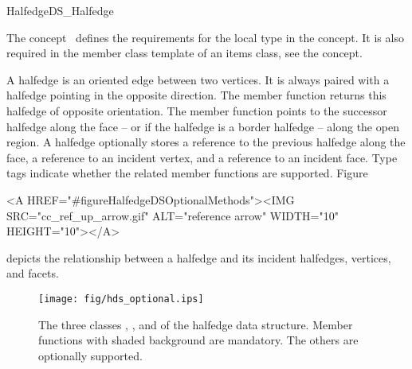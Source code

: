 
\ccRefPageBegin



\begin{ccRefConcept}{HalfedgeDS_Halfedge}
\label{pageHalfedgeDSItemsHalfedgeRef}

\ccDefinition
  
The concept \ccRefName\ defines the requirements for the local  
type in the  concept. It is also required in 
the  member class template of an
items class, see the  concept.

A halfedge is an oriented edge between two vertices. It is always
paired with a halfedge pointing in the opposite direction. The
 member function returns this halfedge of opposite
orientation. The  member function points to the successor
halfedge along the face -- or if the halfedge is a border halfedge --
along the open region. A halfedge optionally stores a reference to the
previous halfedge along the face, a reference to an incident vertex,
and a reference to an incident face. Type tags indicate whether the
related member functions are supported.
Figure~\begin{ccHtmlOnly}
  <A HREF="#figureHalfedgeDSOptionalMethods"><IMG 
  SRC="cc_ref_up_arrow.gif" ALT="reference arrow" WIDTH="10" HEIGHT="10"></A>
\end{ccHtmlOnly}
depicts the relationship between a halfedge and its incident
halfedges, vertices, and facets.

\begin{ccTexOnly}
    \begin{figure}[bht]
        \begin{center}
          \parbox{\textwidth}{%
              \texttt{[image: fig/hds\_optional.ips]}%
          }
        \end{center}
        \caption{The three classes \protect{}, 
          \protect{}, and 
          \protect{} of the halfedge data structure. Member
          functions with shaded background are mandatory. The others
          are optionally supported.}
        \label{figureHalfedgeDSOptionalMethods}
    \end{figure}
\end{ccTexOnly}


\end{ccRefConcept}
